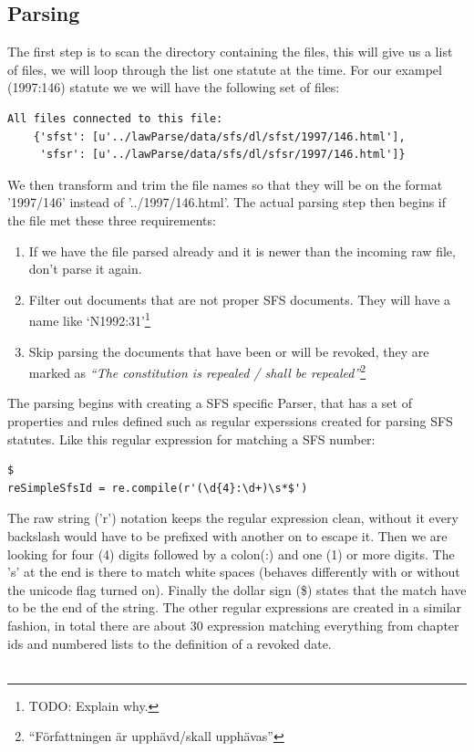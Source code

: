 \subsection{Parsing}

The first step is to scan the directory containing the files, this will give us a list of files, we will loop through the list one statute at the time. For our exampel (1997:146) statute we we will have the following set of files:\\ 
\begin{verbatim}
All files connected to this file: 
	{'sfst': [u'../lawParse/data/sfs/dl/sfst/1997/146.html'], 
	 'sfsr': [u'../lawParse/data/sfs/dl/sfsr/1997/146.html']}
\end{verbatim}
\linebreak
We then transform and trim the file names so that they will be on the format '1997/146' instead of '../1997/146.html'. The actual parsing step then begins if the file met these three requirements:
\begin{enumerate}
\item If we have the file parsed already and it is newer than the incoming raw file, don't parse it again.
\item Filter out documents that are not proper SFS documents. They will have a name like ‘N1992:31’\footnote{TODO: Explain why.}
\item Skip parsing the documents that have been or will be revoked, they are marked as \textit{“The constitution is repealed / shall be repealed”}\footnote{“Författningen är upphävd/skall upphävas”}
\end{enumerate}
The parsing begins with creating a SFS specific Parser, that has a set of properties and rules defined such as regular experssions created for parsing SFS statutes. Like this regular expression for matching a SFS number:\\
\begin{verbatim}
$
reSimpleSfsId = re.compile(r'(\d{4}:\d+)\s*$')
\end{verbatim}
\linebreak
The raw string ('r') notation keeps the regular expression clean, without it every backslash would have to be prefixed with another on to escape it. Then we are looking for four (4) digits followed by a colon(:) and one (1) or more digits. The 's' at the end is there to match white spaces (behaves differently with or without the unicode flag turned on). Finally the dollar sign (\$) states that the match have to be the end of the string. The other regular expressions are created in a similar fashion, in total there are about 30 expression matching everything from chapter ids and numbered lists to the definition of a revoked date.\\\\  
